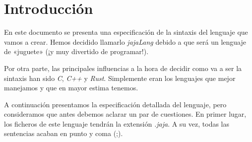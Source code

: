 \section*{Introducción}
En este documento se presenta una especificación de la sintaxis del lenguaje que
vamos a crear. Hemos decidido llamarlo \textit{jajaLang} debido a que será un
lenguaje de «juguete» (¡y muy divertido de programar!).

Por otra parte, las principales influencias a la hora de decidir como va a ser
la sintaxis han sido \textit{C}, \textit{C++} y \textit{Rust}. Simplemente eran
los lenguajes que mejor manejamos y que en mayor estima tenemos.

A continuación presentamos la especificación detallada del lenguaje, pero
consideramos que antes debemos aclarar un par de cuestiones. En primer lugar,
los ficheros de este lenguaje tendrán la extensión \textit{.jaja}. A su vez,
todas las sentencias acaban en punto y coma (;).
